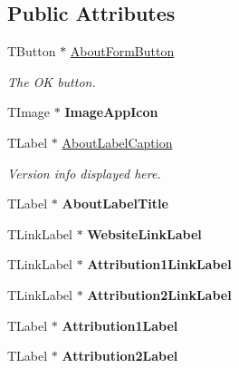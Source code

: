 \subsection*{Public Attributes}
\begin{DoxyCompactItemize}
\item 
\mbox{\label{class_t_about_form_add3f256ba4f1ed42204c0e77c0d71552}} 
T\+Button $\ast$ \mbox{\hyperlink{class_t_about_form_add3f256ba4f1ed42204c0e77c0d71552}{About\+Form\+Button}}
\begin{DoxyCompactList}\small\item\em The OK button. \end{DoxyCompactList}\item 
\mbox{\label{class_t_about_form_a3c3968d0c1473343931bdd0ac25d99ab}} 
T\+Image $\ast$ {\bfseries Image\+App\+Icon}
\item 
\mbox{\label{class_t_about_form_aa188b96e0810fb8944b8e7fd7a2deea4}} 
T\+Label $\ast$ \mbox{\hyperlink{class_t_about_form_aa188b96e0810fb8944b8e7fd7a2deea4}{About\+Label\+Caption}}
\begin{DoxyCompactList}\small\item\em Version info displayed here. \end{DoxyCompactList}\item 
\mbox{\label{class_t_about_form_a0d1afa81071159368263c6a1d1ed0c7d}} 
T\+Label $\ast$ {\bfseries About\+Label\+Title}
\item 
\mbox{\label{class_t_about_form_a809ee5cebba2a7638a31540c5b40cb28}} 
T\+Link\+Label $\ast$ {\bfseries Website\+Link\+Label}
\item 
\mbox{\label{class_t_about_form_ab5ff9a28b7aa8db5c5723c8e48c4f2e1}} 
T\+Link\+Label $\ast$ {\bfseries Attribution1\+Link\+Label}
\item 
\mbox{\label{class_t_about_form_a4f86b2ad44b1d3de8daac70528a1a3a5}} 
T\+Link\+Label $\ast$ {\bfseries Attribution2\+Link\+Label}
\item 
\mbox{\label{class_t_about_form_a0ff4e741e1c1c280733c3a9ccde35413}} 
T\+Label $\ast$ {\bfseries Attribution1\+Label}
\item 
\mbox{\label{class_t_about_form_adfcb216e6b70a6369dd33837e8875503}} 
T\+Label $\ast$ {\bfseries Attribution2\+Label}
\end{DoxyCompactItemize}


